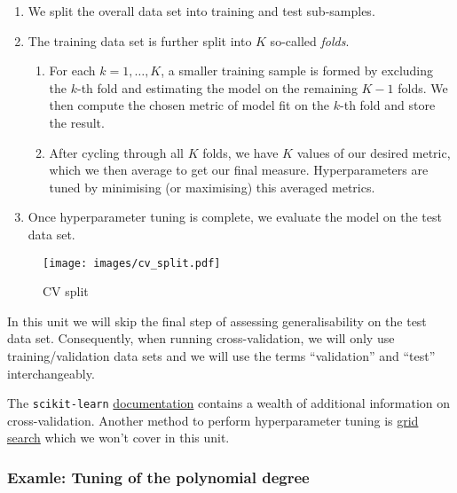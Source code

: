 \documentclass{scrartcl}
\providecommand{\tightlist}{%
      \setlength{\itemsep}{0pt}\setlength{\parskip}{0pt}}
\begin{document}
\begin{enumerate}
\def\labelenumi{\arabic{enumi}.}
\tightlist
\item
  We split the overall data set into training and test sub-samples.
\item
  The training data set is further split into \(K\) so-called
  \emph{folds}.

  \begin{enumerate}
  \def\labelenumii{\arabic{enumii}.}
  \tightlist
  \item
    For each \(k = 1,\dots,K\), a smaller training sample is formed by
    excluding the \(k\)-th fold and estimating the model on the
    remaining \(K-1\) folds. We then compute the chosen metric of model
    fit on the \(k\)-th fold and store the result.
  \item
    After cycling through all \(K\) folds, we have \(K\) values of our
    desired metric, which we then average to get our final measure.
    Hyperparameters are tuned by minimising (or maximising) this
    averaged metrics.
  \end{enumerate}
\item
  Once hyperparameter tuning is complete, we evaluate the model on the
  test data set.
\end{enumerate}

    \begin{figure}
\centering
\begin{adjustbox}{max totalheight=0.4\textheight}
\texttt{[image: images/cv\_split.pdf]}
\end{adjustbox}
\caption{CV split}
\end{figure}

    In this unit we will skip the final step of assessing generalisability
on the test data set. Consequently, when running cross-validation, we
will only use training/validation data sets and we will use the terms
``validation'' and ``test'' interchangeably.

The \texttt{scikit-learn}
\href{https://scikit-learn.org/stable/modules/cross_validation.html}{documentation}
contains a wealth of additional information on cross-validation. Another
method to perform hyperparameter tuning is
\href{https://scikit-learn.org/stable/modules/grid_search.html}{grid
search} which we won't cover in this unit.

    \hypertarget{examle-tuning-of-the-polynomial-degree}{%
\subsubsection{Examle: Tuning of the polynomial
degree}\label{examle-tuning-of-the-polynomial-degree}}
\end{document}
